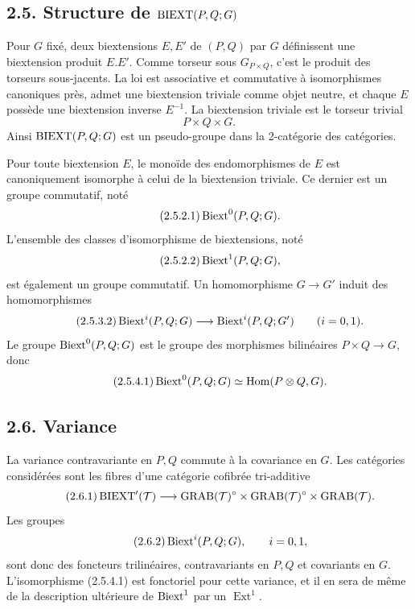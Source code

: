 \documentclass[11pt]{article}
\providecommand{\Ext}{\operatorname{Ext}}
\begin{document}
\subsection*{2.5. Structure de \(\operatorname{BIEXT}(P,Q;G)\)}
Pour \(G\) fixé, deux biextensions \(E,E'\) de \((P,Q)\) par \(G\) définissent une biextension produit \(E.E'\).  Comme torseur sous \(G_{P\times Q}\), c'est le produit des torseurs sous-jacents.  La loi est associative et commutative à isomorphismes canoniques près, admet une biextension triviale comme objet neutre, et chaque \(E\) possède une biextension inverse \(E^{-1}\).  La biextension triviale est le torseur trivial
\begin{equation}\tag{2.5.1.1}
  P\times Q\times G.
\end{equation}
Ainsi \(\operatorname{BIEXT}(P,Q;G)\) est un pseudo-groupe dans la 2-catégorie des catégories.

Pour toute biextension \(E\), le monoïde des endomorphismes de \(E\) est canoniquement isomorphe à celui de la biextension triviale.  Ce dernier est un groupe commutatif, noté
\begin{equation}\tag{2.5.2.1}
  \operatorname{Biext}^0(P,Q;G).
\end{equation}
L'ensemble des classes d'isomorphisme de biextensions, noté
\begin{equation}\tag{2.5.2.2}
  \operatorname{Biext}^1(P,Q;G),
\end{equation}
est également un groupe commutatif.  Un homomorphisme \(G\to G'\) induit des homomorphismes
\begin{equation}\tag{2.5.3.2}
  \operatorname{Biext}^i(P,Q;G)\longrightarrow\operatorname{Biext}^i(P,Q;G')\qquad(i=0,1).
\end{equation}
Le groupe \(\operatorname{Biext}^0(P,Q;G)\) est le groupe des morphismes bilinéaires \(P\times Q\to G\), donc
\begin{equation}\tag{2.5.4.1}
  \operatorname{Biext}^0(P,Q;G)\simeq\operatorname{Hom}(P\otimes Q,G).
\end{equation}

\subsection*{2.6. Variance}
La variance contravariante en \(P,Q\) commute à la covariance en \(G\).  Les catégories considérées sont les fibres d'une catégorie cofibrée tri-additive
\begin{equation}\tag{2.6.1}
  \operatorname{BIEXT}'(\mathcal T)\longrightarrow
  \operatorname{GRAB}(\mathcal T)^\circ\times\operatorname{GRAB}(\mathcal T)^\circ\times\operatorname{GRAB}(\mathcal T).
\end{equation}
Les groupes
\begin{equation}\tag{2.6.2}
  \operatorname{Biext}^i(P,Q;G),\qquad i=0,1,
\end{equation}
sont donc des foncteurs trilinéaires, contravariants en \(P,Q\) et covariants en \(G\).  L'isomorphisme (2.5.4.1) est fonctoriel pour cette variance, et il en sera de même de la description ultérieure de \(\operatorname{Biext}^1\) par un \(\Ext^1\).
\end{document}
